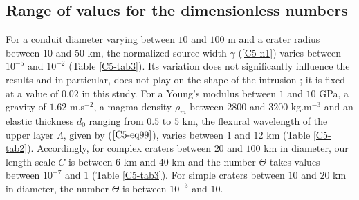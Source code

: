 	
\subsection{Range of values for the dimensionless numbers}
\label{C5-Dimensionless_Number}
	 
For a conduit  diameter varying between $10$ and $100$  m and a crater
radius between $10$ and $50$  km, the normalized source width $\gamma$
(\ref{C5-n1})   varies   between   $10^{-5}$  and   $10^{-2}$   (Table
\ref{C5-tab3}).  Its  variation does  not significantly  influence the
results and in particular, does not play on the shape of the intrusion
\citep{Michaut:2011kg} ;  it is  fixed at  a value  of $0.02$  in this
study. For  a Young's modulus between  $1$ and $10$ GPa,  a gravity of
$1.62$ m.s$^{-2}$, a magma density  $\rho_m$ between $2800$ and $3200$
kg.m$^{-3}$ and an elastic thickness $d_0$ ranging from $0.5$ to $5$
km, the  flexural wavelength  of the upper  layer $\Lambda$,  given by
($\ref{C5-eq99}$),   varies   between   $1$   and   $12$   km   (Table
\ref{C5-tab2}).   Accordingly, for  complex craters  between $20$  and
$100$ km in diameter, our length scale  $C$ is between $6$ km and $40$
km  and the  number $\Theta$  takes values  between $10^{-7}$  and $1$
(Table \ref{C5-tab3}).  For simple craters between $10$ and $20$ km in
diameter, the number $\Theta$ is between $10^{-3}$ and $10$.

